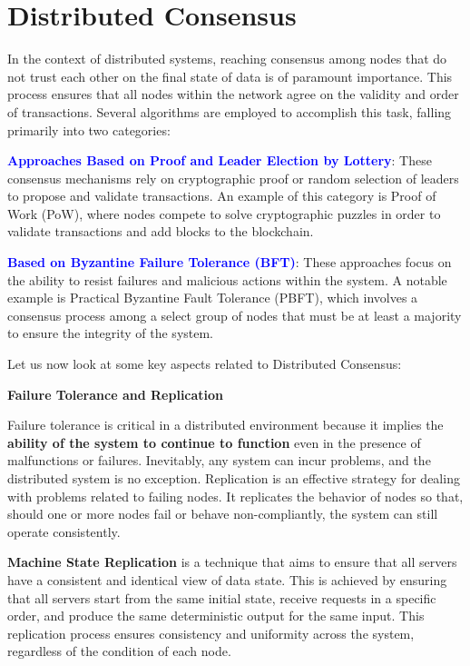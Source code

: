 \section{Distributed Consensus}
In the context of distributed systems, reaching consensus among nodes that do not trust each other on the final state of data is of paramount importance. This process ensures that all nodes within the network agree on the validity and order of transactions. Several algorithms are employed to accomplish this task, falling primarily into two categories:

\textbf{\textcolor{Blue}{Approaches Based on Proof and Leader Election by Lottery}}: These consensus mechanisms rely on cryptographic proof or random selection of leaders to propose and validate transactions. An example of this category is Proof of Work (PoW), where nodes compete to solve cryptographic puzzles in order to validate transactions and add blocks to the blockchain.

\textbf{\textcolor{Blue}{Based on Byzantine Failure Tolerance (BFT)}}: These approaches focus on the ability to resist failures and malicious actions within the system. A notable example is Practical Byzantine Fault Tolerance (PBFT), which involves a consensus process among a select group of nodes that must be at least a majority to ensure the integrity of the system.

Let us now look at some key aspects related to Distributed Consensus:

\faBug \quad \textbf{Failure Tolerance and Replication}

Failure tolerance is critical in a distributed environment because it implies the \textbf{ability of the system to continue to function} even in the presence of malfunctions or failures. Inevitably, any system can incur problems, and the distributed system is no exception. Replication is an effective strategy for dealing with problems related to failing nodes. It replicates the behavior of nodes so that, should one or more nodes fail or behave non-compliantly, the system can still operate consistently.

\textbf{Machine State Replication} is a technique that aims to ensure that all servers have a consistent and identical view of data state. This is achieved by ensuring that all servers start from the same initial state, receive requests in a specific order, and produce the same deterministic output for the same input. This replication process ensures consistency and uniformity across the system, regardless of the condition of each node.

